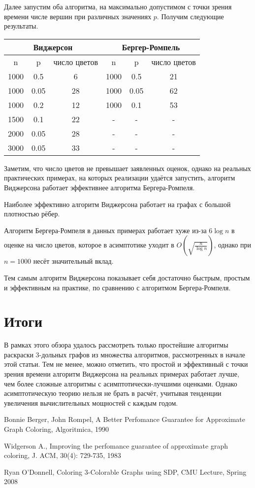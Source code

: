 \documentclass{article}
\begin{document}
Далее запустим оба алгоритма, на максимально допустимом с точки зрения времени числе вершин при различных значениях $p$.
Получим следующие результаты.

\begin{tabular}{|c|c|c|c|c|c|}
\hline
\multicolumn{3}{|c}{Виджерсон} & \multicolumn{3}{|c|}{Бергер-Ромпель}
\\
\hline
n & p & число цветов & n & p & число цветов
\\ \hline
1000 & 0.5 & 6 & 1000 & 0.5 & 21 \\ \hline
1000 & 0.05 & 28 & 1000 & 0.05 & 62 \\ \hline
1000 & 0.2 & 12 & 1000 & 0.1 & 53 \\ \hline
1500 & 0.1 & 22 & - & - & - \\ \hline
2000 & 0.05 & 28 & - & - & - \\ \hline
3000 & 0.05 & 33 & - & - & - \\
\hline

\end{tabular}

\bigskip

Заметим, что число цветов не превышает заявленных оценок, однако на реальных практических примерах, на которых реализации удаётся запустить, алгоритм Виджерсона работает эффективнее алгоритма Бергера-Ромпеля.

Наиболее эффективно алгоритм Виджерсона работает на графах с большой плотностью рёбер.

Алгоритм Бергера-Ромпеля в данных примерах работает хуже из-за $6\log{n}$ в оценке на число цветов, которое в асимптотике уходит в $O(\sqrt{\frac{n}{\log{n}}})$, однако при $n=1000$ несёт значительный вклад.

Тем самым алгоритм Виджерсона показывает себя достаточно быстрым, простым и эффективным на практике, по сравнению с алгоритмом Бергера-Ромпеля.

\section{Итоги}

В рамках этого обзора удалось рассмотреть только простейшие алгоритмы раскраски 3-дольных графов из множества алгоритмов, рассмотренных в начале этой статьи. Тем не менее, можно отметить, что простой и эффективный с точки зрения времени алгоритм Виджерсона на реальных примерах работает лучше, чем более сложные алгоритмы с асимптотически-лучшими оценками. Однако асимптотическую теорию нельзя не брать в расчёт, учитывая тенденции увеличения вычислительных мощностей с каждым годом.

\begin{thebibliography}{1}

  Bonnie Berger, John Rompel,
  A Better Perfomance Guarantee for Approximate Graph Coloring,
  Algoritmica, 1990
  
  Widgerson A.,
  Improving the perfomance guarantee of approximate graph coloring,
  J. ACM, 30(4): 729-735, 1983

  Ryan O'Donnell,
  Coloring 3-Colorable Graphs using SDP,
  CMU Lecture, Spring 2008  

\end{thebibliography}
\end{document}
